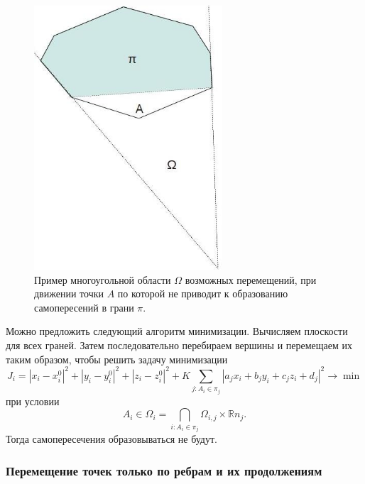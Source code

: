 \documentclass[a4paper,12pt, titlepage]{article}
\begin{document}
\begin{flushleft}
  \begin{figure}[p]
    \includegraphics[width=7cm]{img/region.jpg}
    \caption{Пример многоугольной области $\Omega$ возможных перемещений,
      при движении точки $A$ по которой не приводит к образованию самопересений в грани $\pi$.}
    \label{region}
  \end{figure}
\end{flushleft}

\begin{flushleft}
   Можно предложить следующий алгоритм минимизации. Вычисляем плоскости для всех граней. 
Затем последовательно перебираем вершины и перемещаем их таким образом, чтобы
решить задачу минимизации
\begin{equation}
 	J_{i} = |x_{i} - x_{i}^{0}|^{2} + |y_{i} - y_{i}^{0}|^{2} 
	+ |z_{i} - z_{i}^{0}|^{2} + 
	K\sum\limits_{j: A_{i} \in \pi_{j}}
	|a_{j}x_{i} + b_{j}y_{i} + c_{j}z_{i} + d_{j}|^{2} \to \min
\end{equation}
при условии
\begin{equation}
 A_{i} \in \Omega_{i} = \bigcap\limits_{i: A_{i} \in \pi_{j}} 
\Omega_{i, j} \times \mathbb{R}n_{j}.
\end{equation}
Тогда самопересечения образовываться не будут.
\end{flushleft}


\subsubsection{Перемещение точек только по ребрам и их продолжениям}
\end{document}
